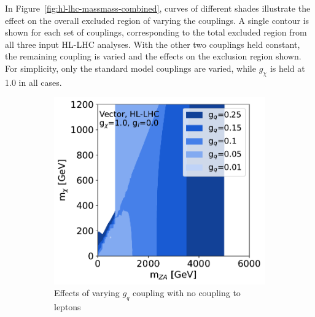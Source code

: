 \documentclass[11pt]{article}
\begin{document}
In Figure~\ref{fig:hl-lhc-massmass-combined}, curves of different shades illustrate the effect on the overall excluded region of varying the couplings. A single contour is shown for each set of couplings, corresponding to the total excluded region from all three input HL-LHC analyses. With the other two couplings held constant, the remaining coupling is varied and the effects on the exclusion region shown. For simplicity, only the standard model couplings are varied, while $g_{\chi}$ is held at 1.0 in all cases. 

\begin{figure}
     \centering
     \begin{subfigure}[b]{0.49\textwidth}
         \centering
         \includegraphics[width=\textwidth]{SummaryPlots-EF10/figures/massmass/hl-lhc/massmass_vector_gl0.0_gdm1.0.pdf}
         \caption{Effects of varying $g_q$ coupling with no coupling to leptons}
         \label{subfig:vector-hl-lhc-gqvariations1}
     \end{subfigure}
     \hfill
     \begin{subfigure}[b]{0.49\textwidth}
         \centering

\end{subfigure}
\end{figure}
\end{document}
